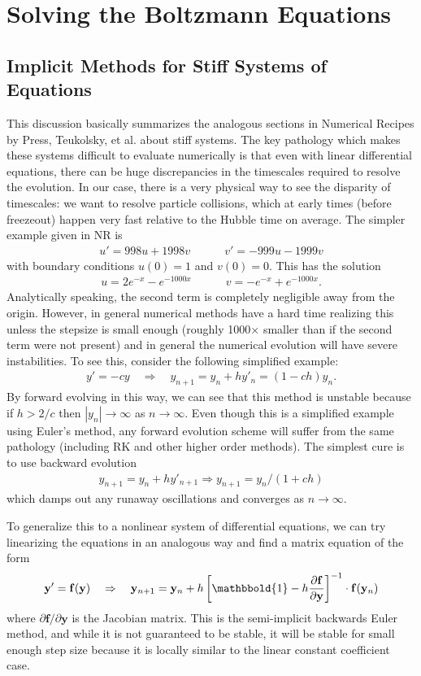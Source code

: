\documentclass[superscriptaddress,nofootinbib,notitlepage,onecolumn]{revtex4-1}
\newcommand{\beq}{\begin{eqnarray}}
\newcommand{\eeq}{\end{eqnarray}}
\newcommand{\abs}[1]{\left| #1 \right|}
\renewcommand{\vec}[1]{\mathbf{#1}}
\begin{document}
\section{Solving the Boltzmann Equations}
\subsection{Implicit Methods for Stiff Systems of Equations}
This discussion basically summarizes the analogous sections in Numerical Recipes by Press, Teukolsky, et al. about stiff systems. The key pathology which makes these systems difficult to evaluate numerically is that even with linear differential equations, there can be huge discrepancies in the timescales required to resolve the evolution. In our case, there is a very physical way to see the disparity of timescales: we want to resolve particle collisions, which at early times (before freezeout) happen very fast relative to the Hubble time on average. The simpler example given in NR is \beq u' = 998 u +1998 v \quad \quad \quad v' = -999 u - 1999 v \eeq with boundary conditions $u(0) = 1$ and $v(0) = 0$.
This has the solution \beq u = 2 e^{-x} - e^{-1000 x} \quad \quad \quad v = - e^{-x} + e^{-1000 x} .\eeq Analytically speaking, the second term is completely negligible away from the origin. However, in general numerical methods have a hard time realizing this unless the stepsize is small enough (roughly 1000$\times$ smaller than if the second term were not present) and in general the numerical evolution will have severe instabilities. To see this, consider the following simplified example: \beq y' = -c y \quad \Rightarrow \quad y_{n+1} = y_n + h y'_n = (1 - c h ) y_n.\eeq
By forward evolving in this way, we can see that this method is unstable because if $h>2/c$ then $\abs{y_n} \rightarrow \infty$ as $n\rightarrow \infty$. Even though this is a simplified example using Euler's method, any forward evolution scheme will suffer from the same pathology (including RK and other higher order methods). The simplest cure is to use backward evolution \beq y_{n+1} = y_n + h y'_{n+1} \Rightarrow y_{n+1} = y_n / (1 + c h )\eeq which damps out any runaway oscillations and converges as $n\rightarrow \infty$.

To generalize this to a nonlinear system of differential equations, we can try linearizing the equations in an analogous way and find a matrix equation of the form \beq \vec{y}' = \vec{f}(\vec{y}) \quad \Rightarrow \quad  \vec{y}_{n+1}  = \vec{y}_n + h \left[ \mathbbold{1} - h \frac{\partial\vec{f} }{\partial \vec{y}} \right]^{-1} \cdot \vec{f}(\vec{y}_n) \label{implicit} \eeq
where $\partial \vec{f} /\partial \vec{y}$ is the Jacobian matrix. This is the semi-implicit backwards Euler method, and while it is not guaranteed to be stable, it will be stable for small enough step size because it is locally similar to the linear constant coefficient case.
\end{document}

